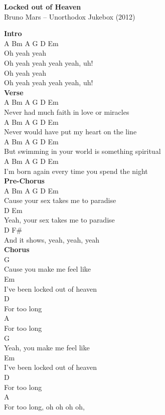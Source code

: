 \documentclass[a4paper]{article}
\begin{document}
    \begin{center}
        \textbf{Locked out of Heaven}
        ~\\
        Bruno Mars -- Unorthodox Jukebox (2012)
    \end{center}
    {
        \scriptsize
        \textbf{Intro}
        ~\\
        {
            \cutive
            \obeyspaces
A Bm A G D Em
\\
Oh yeah yeah
\\
Oh yeah yeah yeah yeah, uh!
\\
Oh yeah yeah
\\
Oh yeah yeah yeah yeah, uh!
\\

        }
        \textbf{Verse}
        ~\\
        {
            \cutive
            \obeyspaces
A Bm A G D Em
\\
     Never had much faith in love or miracles
\\
A Bm A G D Em
\\
     Never would have put my heart on the line
\\
A Bm A G D Em
\\
     But swimming in your world is something spiritual 
\\
A Bm A G D Em
\\
     I'm born again every time you spend the night
\\

        }
        \textbf{Pre-Chorus}
        ~\\
        {
            \cutive
            \obeyspaces
A Bm A G D Em
\\
Cause your sex takes me to paradise
\\
D Em
\\
Yeah, your sex takes me to paradise
\\
        D         F\#
\\
And it shows, yeah, yeah, yeah
\\

        }
        \textbf{Chorus}
        ~\\
        {
            \cutive
            \obeyspaces
                  G
\\
Cause you make me feel like
\\
                        Em
\\
I've been locked out of heaven
\\
        D
\\
For too long
\\
        A
\\
For too long
\\
                       G
\\
Yeah, you make me feel like
\\
                        Em
\\
I've been locked out of heaven
\\
        D
\\
For too long 
\\
        A
\\
For too long, oh oh oh oh,
\\

}}
\end{document}
